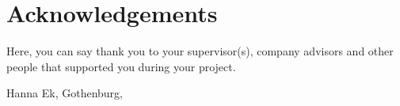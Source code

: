 \thispagestyle{plain}			%
\section*{Acknowledgements}

Here, you can say thank you to your supervisor(s), company advisors and other people that supported you during your project.

\vspace{1.5cm}
\hfill
Hanna Ek, Gothenburg, \monthname \space \the\year

\newpage				%
\thispagestyle{empty}
\mbox{}